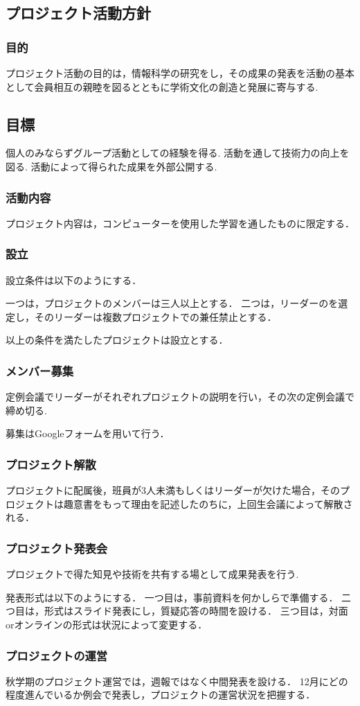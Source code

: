 \subsection*{プロジェクト活動方針}


\subsubsection*{目的}
プロジェクト活動の目的は，情報科学の研究をし，その成果の発表を活動の基本として会員相互の親睦を図るとともに学術文化の創造と発展に寄与する.

\subsection{目標}
個人のみならずグループ活動としての経験を得る.
活動を通して技術力の向上を図る.
活動によって得られた成果を外部公開する.

\subsubsection*{活動内容}
プロジェクト内容は，コンピューターを使用した学習を通したものに限定する．

\subsubsection*{設立}
設立条件は以下のようにする．

一つは，プロジェクトのメンバーは三人以上とする．
二つは，リーダーのを選定し，そのリーダーは複数プロジェクトでの兼任禁止とする．

以上の条件を満たしたプロジェクトは設立とする．

\subsubsection*{メンバー募集}
定例会議でリーダーがそれぞれプロジェクトの説明を行い，その次の定例会議で締め切る.

募集はGoogleフォームを用いて行う．

\subsubsection*{プロジェクト解散}
プロジェクトに配属後，班員が3人未満もしくはリーダーが欠けた場合，そのプロジェクトは趣意書をもって理由を記述したのちに，上回生会議によって解散される．

\subsubsection*{プロジェクト発表会}
プロジェクトで得た知見や技術を共有する場として成果発表を行う.

発表形式は以下のようにする．
一つ目は，事前資料を何かしらで準備する．
二つ目は，形式はスライド発表にし，質疑応答の時間を設ける．
三つ目は，対面orオンラインの形式は状況によって変更する．

\subsubsection*{プロジェクトの運営}
秋学期のプロジェクト運営では，週報ではなく中間発表を設ける．
12月にどの程度進んでいるか例会で発表し，プロジェクトの運営状況を把握する．
